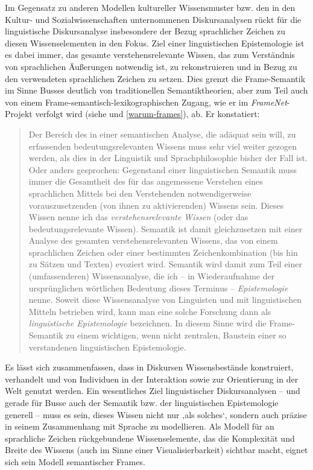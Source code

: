 Im Gegensatz zu anderen Modellen kultureller Wissensmuster bzw. den in den Kultur- und Sozialwissenschaften unternommenen Diskursanalysen rückt für die linguistische Diskursanalyse insbesondere der Bezug sprachlicher Zeichen zu diesen Wissenselementen in den Fokus. Ziel einer linguistischen Epistemologie ist es dabei immer, das gesamte verstehensrelevante Wissen, das zum Verständnis von sprachlichen Äußerungen notwendig ist, zu rekonstruieren und in Bezug zu den verwendeten sprachlichen Zeichen zu setzen. Dies grenzt die Frame-Semantik im Sinne Busses deutlich von traditionellen Semantiktheorien, aber zum Teil auch von einem Frame-semantisch-lexikographischen Zugang, wie er im \emph{FrameNet}-Projekt verfolgt wird (siehe  und \ref{warum-frames}), ab. Er konstatiert:

\begin{quote}
Der Bereich des in einer semantischen Analyse, die adäquat sein will, zu erfassenden bedeutungsrelevanten Wissens muss sehr viel weiter gezogen werden, als dies in der Linguistik und Sprachphilosophie bisher der Fall ist. Oder anders gesprochen: Gegenstand einer linguistischen Semantik muss immer die Gesamtheit des für das angemessene Verstehen eines sprachlichen Mittels bei den Verstehenden notwendigerweise vorauszusetzenden (von ihnen zu aktivierenden) Wissens sein. Dieses Wissen nenne ich das \emph{verstehensrelevante Wissen} (oder das bedeutungsrelevante Wissen). Semantik ist damit gleichzusetzen mit einer Analyse des gesamten verstehensrelevanten Wissens, das von einem sprachlichen Zeichen oder einer bestimmten Zeichenkombination (bis hin zu Sätzen und Texten) evoziert wird. Semantik wird damit zum Teil einer (umfassenderen) Wissensanalyse, die ich -- in Wiederaufnahme der ursprünglichen wörtlichen Bedeutung dieses Terminus -- \emph{Epistemologie} nenne. Soweit diese Wissensanalyse von Linguisten und mit linguistischen Mitteln betrieben wird, kann man eine solche Forschung dann als \emph{linguistische Epistemologie} bezeichnen. In diesem Sinne wird die Frame-Semantik zu einem wichtigen, wenn nicht zentralen, Baustein einer so verstandenen linguistischen Epistemologie. \autocite[805-806]{busseFrameSemantikKompendium2012}
\end{quote}

Es lässt sich zusammenfassen, dass in Diskursen Wissensbestände konstruiert, verhandelt und von Individuen in der Interaktion sowie zur Orientierung in der Welt genutzt werden. Ein wesentliches Ziel linguistischer Diskursanalysen -- und gerade für Busse auch der Semantik bzw. der linguistischen Epistemologie generell -- muss es sein, dieses Wissen nicht nur ‚als solches`, sondern auch präzise in seinem Zusammenhang mit Sprache zu modellieren. Als Modell für an sprachliche Zeichen rückgebundene Wissenselemente, das die Komplexität und Breite des Wissens (auch im Sinne einer Visualisierbarkeit) sichtbar macht, eignet sich sein Modell semantischer Frames.

